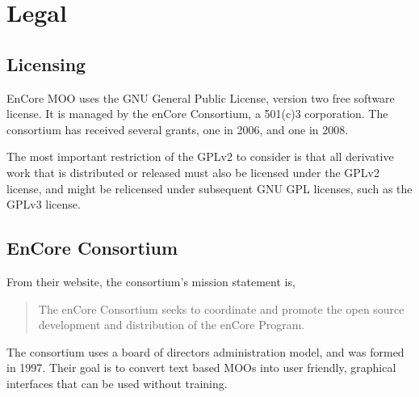 \documentclass[12pt, letterpaper]{report}
\begin{document}
\chapter{Legal}
\section{Licensing}
\par
EnCore MOO uses the GNU General Public License, version two free software license. It is managed by the enCore Consortium, a 501(c)3 corporation. The consortium has received several grants, one in 2006, and one in 2008.

\par
The most important restriction of the GPLv2 to consider is that all derivative work that is distributed or released must also be licensed under the GPLv2 license, and might be relicensed under subsequent GNU GPL licenses, such as the GPLv3 license. \cite{GPLv2}

\section{EnCore Consortium}
\par

\par 
From their website, the consortium's mission statement is,

\begin{quotation}
The enCore Consortium seeks to coordinate and promote the open source development and distribution of the enCore Program.
\end{quotation}

\par
The consortium uses a board of directors administration model, and was formed in 1997. Their goal is to convert text based MOOs into user friendly, graphical interfaces that can be used without training.
\end{document}
